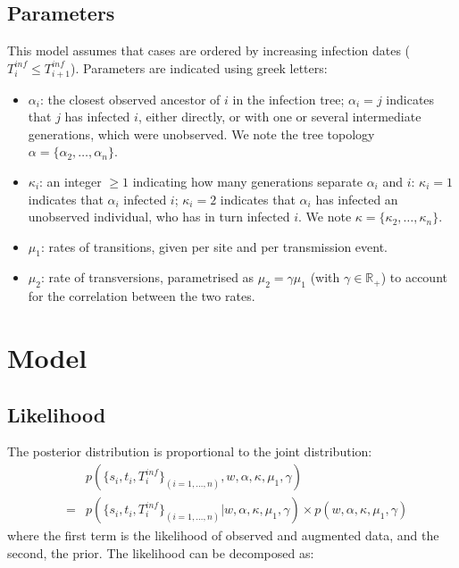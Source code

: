 \documentclass[10pt]{article}
\begin{document}
\subsection*{Parameters}
This model assumes that cases are ordered by increasing infection dates ($T_i^{inf} \leq T_{i+1}^{inf}$).
Parameters are indicated using greek letters:
\begin{itemize}
         \item $\alpha_i$: the closest observed ancestor of $i$ in the infection tree; $\alpha_i=j$ indicates that $j$ has infected $i$, either directly, or with one or several intermediate generations, which were unobserved. 
We note the tree topology $\alpha = \{\alpha_2, \ldots, \alpha_n\}$.
 	\item $\kappa_i$: an integer $\geq 1$ indicating how many generations separate $\alpha_i$ and $i$: $\kappa_i=1$ indicates that $\alpha_i$ infected $i$; $\kappa_i=2$ indicates that $\alpha_i$ has infected an unobserved individual, who has in turn infected $i$.
We note $\kappa = \{\kappa_2, \ldots, \kappa_n\}$.

	\item $\mu_1$: rates of transitions, given per site and per transmission event.
	\item $\mu_2 $: rate of transversions, parametrised as $\mu_2 = \gamma \mu_1$ (with $\gamma \in \mathbb{R}_+$) to account for the correlation between the two rates.
\end{itemize}






\section*{Model}

\subsection*{Likelihood}

The posterior distribution is proportional to the joint distribution:
\begin{eqnarray}
& & p(\{s_i, t_i, T_i^{inf}\}_{(i=1,\ldots,n)}, w,  \alpha, \kappa, \mu_1, \gamma)\\
& = & p(\{s_i, t_i, T_i^{inf}\}_{(i=1,\ldots,n)}| w,  \alpha, \kappa, \mu_1, \gamma) \times p( w,  \alpha, \kappa, \mu_1, \gamma)
\end{eqnarray}
where the first term is the likelihood of observed and augmented data, and the second, the prior.
The likelihood can be decomposed as:
\end{document}
